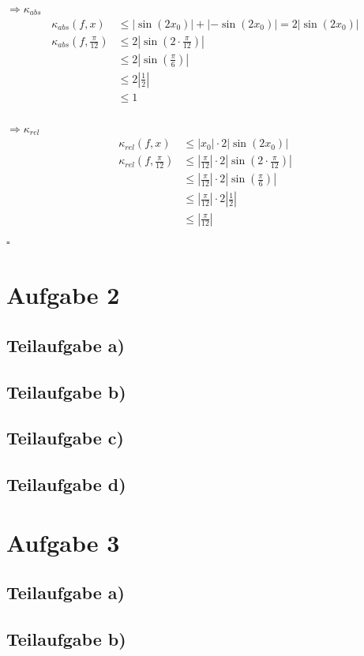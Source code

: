 \documentclass{llncs}
\begin{document}
$\Rightarrow \kappa_{abs}$ 
\begin{align*}
\kappa_{abs}(f,x)&\le |\sin(2x_0)| + |-\sin(2x_0)| = 2|\sin(2x_0)|\\  
\kappa_{abs}(f,\frac{\pi}{12})&\le  2|\sin(2\cdot \frac{\pi}{12})|\\
&\le  2|\sin( \frac{\pi}{6})|\\
&\le  2|\frac{1}{2}|\\
&\le  1\\
\end{align*}

$\Rightarrow \kappa_{rel}$ 
\begin{align*}
\kappa_{rel}(f,x) &\le  |x_0|\cdot 2|\sin(2x_0)|\\ 
\kappa_{rel}(f,\frac{\pi}{12}) &\le  |\frac{\pi}{12}|\cdot 2|\sin(2\cdot \frac{\pi}{12})|\\
&\le  |\frac{\pi}{12}|\cdot 2|\sin(\frac{\pi}{6})|\\
&\le  |\frac{\pi}{12}|\cdot 2|\frac{1}{2}|\\
&\le  |\frac{\pi}{12}|\\
\end{align*} \hfill $\square$\\
\newpage
\section*{Aufgabe 2}

\subsection*{Teilaufgabe a)}
\subsection*{Teilaufgabe b)}
\subsection*{Teilaufgabe c)}
\subsection*{Teilaufgabe d)}

\section*{Aufgabe 3}
\subsection*{Teilaufgabe a)}
\subsection*{Teilaufgabe b)}
\end{document}
